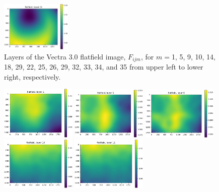 \documentclass[letterpaper,11pt]{article}
\begin{document}
\begin{figure}[!ht]
\includegraphics[width=0.3\textwidth]{images/results/flatfield_layers_vectra/flatfield_layer_35}
\caption{\footnotesize Layers of the Vectra 3.0 flatfield image, $F_{ijm}$, for $m=$1, 5, 9, 10, 14, 18, 29, 22, 25, 26, 29, 32, 33, 34, and 35 from upper left to lower right, respectively.}
\label{fig:flatfield_image_layers_vectra}
\end{figure}

\begin{figure}[!ht]
\centering
\includegraphics[width=0.32\textwidth]{images/results/flatfield_layers_polaris/flatfield_layer_1}
\includegraphics[width=0.32\textwidth]{images/results/flatfield_layers_polaris/flatfield_layer_5}
\includegraphics[width=0.32\textwidth]{images/results/flatfield_layers_polaris/flatfield_layer_9}
\includegraphics[width=0.32\textwidth]{images/results/flatfield_layers_polaris/flatfield_layer_10}
\includegraphics[width=0.32\textwidth]{images/results/flatfield_layers_polaris/flatfield_layer_11} \\

\end{figure}
\end{document}
